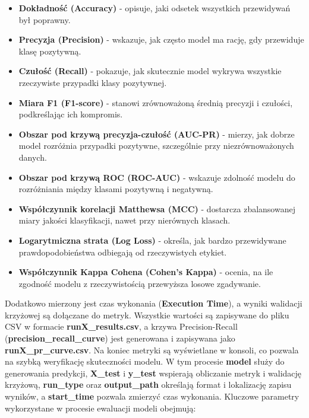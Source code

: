\begin{itemize}
	\item \textbf{Dokładność (Accuracy)} - opisuje, jaki odsetek wszystkich przewidywań był poprawny.
	\item \textbf{Precyzja (Precision)} - wskazuje, jak często model ma rację, gdy przewiduje klasę pozytywną.
	\item \textbf{Czułość (Recall)} - pokazuje, jak skutecznie model wykrywa wszystkie rzeczywiste przypadki klasy pozytywnej.
	\item \textbf{Miara F1 (F1-score)} - stanowi zrównoważoną średnią precyzji i czułości, podkreślając ich kompromis.
	\item \textbf{Obszar pod krzywą precyzja-czułość (AUC-PR)} - mierzy, jak dobrze model rozróżnia przypadki pozytywne, szczególnie przy niezrównoważonych danych.
	\item \textbf{Obszar pod krzywą ROC (ROC-AUC)} - wskazuje zdolność modelu do rozróżniania między klasami pozytywną i negatywną.
	\item \textbf{Współczynnik korelacji Matthewsa (MCC)} - dostarcza zbalansowanej miary jakości klasyfikacji, nawet przy nierównych klasach.
	\item \textbf{Logarytmiczna strata (Log Loss)} - określa, jak bardzo przewidywane prawdopodobieństwa odbiegają od rzeczywistych etykiet.
	\item \textbf{Współczynnik Kappa Cohena (Cohen's Kappa)} - ocenia, na ile zgodność modelu z rzeczywistością przewyższa losowe zgadywanie.
\end{itemize}
Dodatkowo mierzony jest czas wykonania (\textbf{Execution Time}), a wyniki walidacji krzyżowej są dołączane do metryk. Wszystkie wartości są zapisywane do pliku CSV w formacie \textbf{runX\_results.csv}, a krzywa Precision-Recall (\textbf{precision\_recall\_curve}) jest generowana i zapisywana jako \textbf{runX\_pr\_curve.csv}. Na koniec metryki są wyświetlane w konsoli, co pozwala na szybką weryfikację skuteczności modelu. W tym procesie \textbf{model} służy do generowania predykcji, \textbf{X\_test} i \textbf{y\_test} wspierają obliczanie metryk i walidację krzyżową, \textbf{run\_type} oraz \textbf{output\_path} określają format i lokalizację zapisu wyników, a \textbf{start\_time} pozwala zmierzyć czas wykonania. Kluczowe parametry wykorzystane w procesie ewaluacji modeli obejmują:
